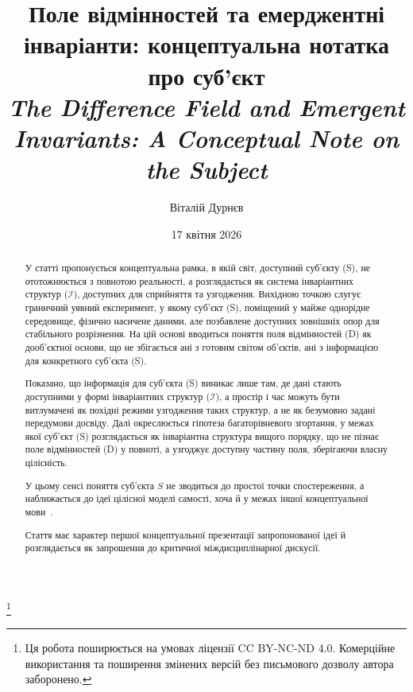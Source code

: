 \documentclass[aps,prd,onecolumn,nofootinbib,superscriptaddress]{revtex4-2} %
\newcommand{\papertitleuk}{Поле відмінностей та емерджентні інваріанти: концептуальна нотатка про суб’єкт}
\newcommand{\papertitleen}{The Difference Field and Emergent Invariants: A Conceptual Note on the Subject}
\newcommand{\paperauthor}{Віталій Дурнєв}
\begin{document}
    \title{
        \papertitleuk\\[0.5em]
        {\large\itshape \papertitleen\/{} }
    }
    \thanks{Ця робота поширюється на умовах ліцензії CC BY-NC-ND 4.0. Комерційне використання та поширення змінених версій без письмового дозволу автора заборонено.}

    \author{\paperauthor}

    \date{17 квітня 2026}

    \begin{abstract}
        У статті пропонується концептуальна рамка, в якій світ, доступний суб’єкту (S), не ототожнюється з повнотою реальності, а розглядається як система інваріантних структур ($\mathcal{I}$), доступних для сприйняття та узгодження. Вихідною точкою слугує граничний уявний експеримент, у якому суб’єкт (S), поміщений у майже однорідне середовище, фізично насичене даними, але позбавлене доступних зовнішніх опор для стабільного розрізнення. На цій основі вводиться поняття поля відмінностей (D) як дооб’єктної основи, що не збігається ані з готовим світом об’єктів, ані з інформацією для конкретного суб’єкта (S).

        Показано, що інформація для суб’єкта (S) виникає лише там, де дані стають доступними у формі інваріантних структур ($\mathcal{I}$), а простір і час можуть бути витлумачені як похідні режими узгодження таких структур, а не як безумовно задані передумови досвіду. Далі окреслюється гіпотеза багаторівневого згортання, у межах якої суб’єкт (S) розглядається як інваріантна структура вищого порядку, що не пізнає поле відмінностей (D) у повноті, а узгоджує доступну частину поля, зберігаючи власну цілісність.

        У цьому сенсі поняття суб’єкта \(S\) не зводиться до простої точки спостереження, а наближається до ідеї цілісної моделі самості, хоча й у межах іншої концептуальної мови~\cite{Metzinger2003}.

        Стаття має характер першої концептуальної презентації запропонованої ідеї й розглядається як запрошення до критичної міждисциплінарної дискусії.
    \end{abstract}

    \maketitle
\end{document}
